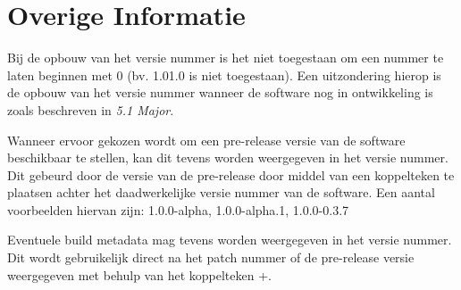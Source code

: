 \section{Overige Informatie}
Bij de opbouw van het versie nummer is het niet toegestaan om een nummer te laten beginnen met 0 (bv. 1.01.0 is niet toegestaan). Een uitzondering hierop is de opbouw van het versie nummer wanneer de software nog in ontwikkeling is zoals beschreven in \textit{5.1 Major}.

Wanneer ervoor gekozen wordt om een pre-release versie van de software beschikbaar te stellen, kan dit tevens worden weergegeven in het versie nummer. Dit gebeurd door de versie van de pre-release door middel van een koppelteken te plaatsen achter het daadwerkelijke versie nummer van de software. Een aantal voorbeelden hiervan zijn: 1.0.0-alpha, 1.0.0-alpha.1, 1.0.0-0.3.7

Eventuele build metadata mag tevens worden weergegeven in het versie nummer. Dit wordt gebruikelijk direct na het patch nummer of de pre-release versie weergegeven met behulp van het koppelteken +.